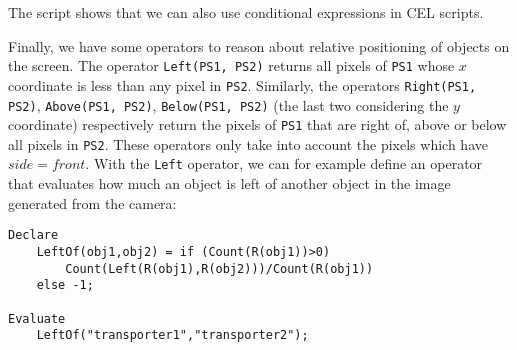 The script shows that we can also use conditional expressions in CEL scripts. 

Finally, we have some operators to reason about relative positioning of objects on the screen. The operator \texttt{Left(PS1, PS2)} returns all pixels of \texttt{PS1} whose $x$ coordinate is less than any pixel in \texttt{PS2}. Similarly, the operators \texttt{Right(PS1, PS2)}, \texttt{Above(PS1, PS2)}, \texttt{Below(PS1, PS2)} (the last two considering the $y$ coordinate) respectively return the pixels of \texttt{PS1} that are right of, above or below all pixels in \texttt{PS2}. These operators only take into account the pixels which have $side=front$.
With the \texttt{Left} operator, we can for example define an operator that evaluates how much an object is left of another object in the image generated from the camera:

\begin{verbatim}
Declare
    LeftOf(obj1,obj2) = if (Count(R(obj1))>0)
        Count(Left(R(obj1),R(obj2)))/Count(R(obj1)) 
    else -1;

Evaluate
    LeftOf("transporter1","transporter2");
\end{verbatim}

